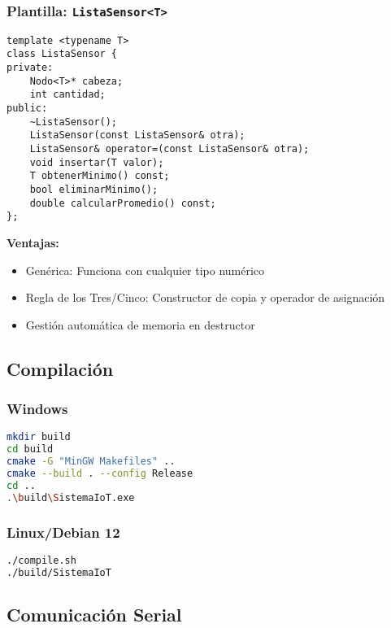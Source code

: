 \documentclass[12pt, spanish]{article}
\begin{document}
\subsubsection{Plantilla: \texttt{ListaSensor<T>}}

\begin{lstlisting}
template <typename T>
class ListaSensor {
private:
    Nodo<T>* cabeza;
    int cantidad;
public:
    ~ListaSensor();
    ListaSensor(const ListaSensor& otra);
    ListaSensor& operator=(const ListaSensor& otra);
    void insertar(T valor);
    T obtenerMinimo() const;
    bool eliminarMinimo();
    double calcularPromedio() const;
};
\end{lstlisting}

\textbf{Ventajas:}
\begin{itemize}
    \item Genérica: Funciona con cualquier tipo numérico
    \item Regla de los Tres/Cinco: Constructor de copia y operador de asignación
    \item Gestión automática de memoria en destructor
\end{itemize}

\subsection{Compilación}

\subsubsection{Windows}

\begin{lstlisting}[language=bash]
mkdir build
cd build
cmake -G "MinGW Makefiles" ..
cmake --build . --config Release
cd ..
.\build\SistemaIoT.exe
\end{lstlisting}

\subsubsection{Linux/Debian 12}

\begin{lstlisting}[language=bash]
./compile.sh
./build/SistemaIoT
\end{lstlisting}

\subsection{Comunicación Serial}
\end{document}

